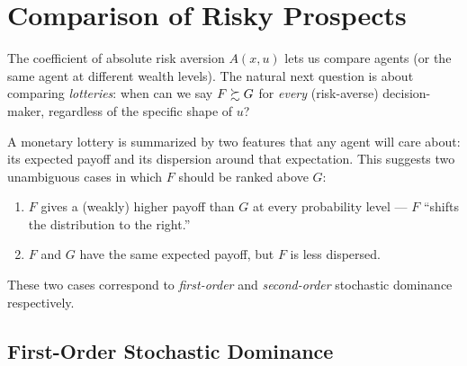 \section{Comparison of Risky Prospects}\label{comparison-of-risky-prospects}

The coefficient of absolute risk aversion \(A(x,u)\) lets us compare
agents (or the same agent at different wealth levels). The natural
next question is about comparing \emph{lotteries}: when can we say
\(F\succsim G\) for \emph{every} (risk-averse) decision-maker, regardless
of the specific shape of \(u\)?

A monetary lottery is summarized by two features that any agent will
care about: its expected payoff and its dispersion around that
expectation. This suggests two unambiguous cases in which \(F\) should
be ranked above \(G\):

\begin{enumerate}
\item
  \(F\) gives a (weakly) higher payoff than \(G\) at every probability
  level — \(F\) ``shifts the distribution to the right.''
\item
  \(F\) and \(G\) have the same expected payoff, but \(F\) is less
  dispersed.
\end{enumerate}

These two cases correspond to \emph{first-order} and
\emph{second-order} stochastic dominance respectively.

\subsection{First-Order Stochastic Dominance}\label{first-order-stochastic-dominance}

